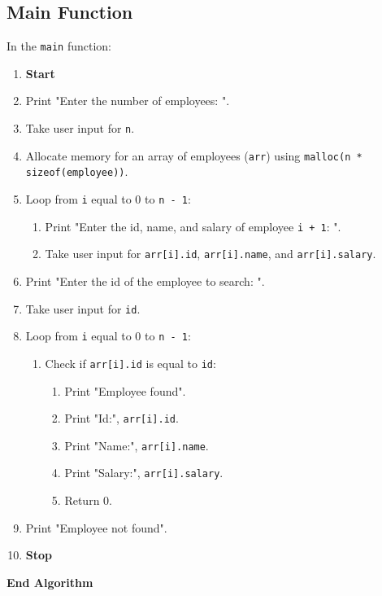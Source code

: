 {  \subsection{Main Function}
  In the \texttt{main} function:
  \begin{enumerate}[label=\arabic*:, start=1]
    \item \textbf{Start}
    \item Print "Enter the number of employees: ".
    \item Take user input for \texttt{n}.
    \item Allocate memory for an array of employees (\texttt{arr}) using \texttt{malloc(n * sizeof(employee))}.
    \item Loop from \texttt{i} equal to 0 to \texttt{n - 1}:
          \begin{enumerate}[label=4.\arabic*:, start=1]
            \item Print "Enter the id, name, and salary of employee \texttt{i + 1}: ".
            \item Take user input for \texttt{arr[i].id}, \texttt{arr[i].name}, and \texttt{arr[i].salary}.
          \end{enumerate}
    \item Print "Enter the id of the employee to search: ".
    \item Take user input for \texttt{id}.
    \item Loop from \texttt{i} equal to 0 to \texttt{n - 1}:
          \begin{enumerate}[label=8.\arabic*:, start=1]
            \item Check if \texttt{arr[i].id} is equal to \texttt{id}:
                  \begin{enumerate}[label=8.1.\arabic*:, start=1]
                    \item Print "Employee found".
                    \item Print "Id:", \texttt{arr[i].id}.
                    \item Print "Name:", \texttt{arr[i].name}.
                    \item Print "Salary:", \texttt{arr[i].salary}.
                    \item Return 0.
                  \end{enumerate}
          \end{enumerate}
    \item Print "Employee not found".
    \item \textbf{Stop}
  \end{enumerate}
  \textbf{End Algorithm}
 }

